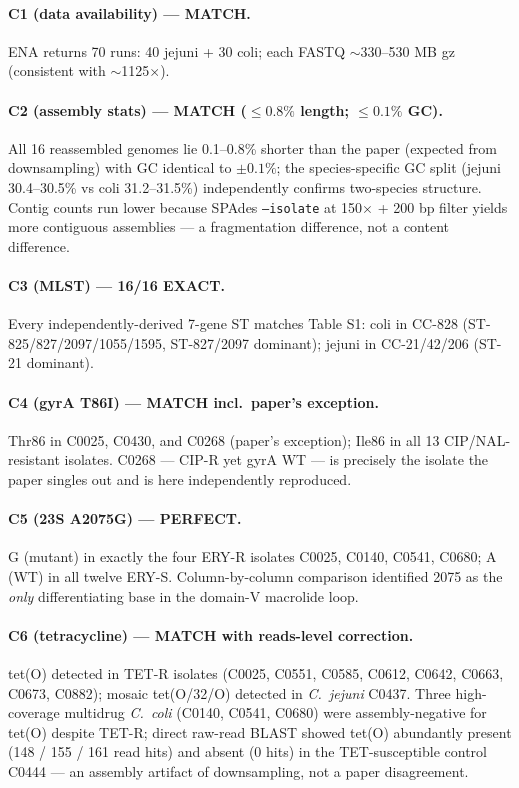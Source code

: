 \documentclass[11pt,a4paper]{article}
\begin{document}
\paragraph{C1 (data availability) --- MATCH.} ENA returns 70 runs: 40 jejuni + 30 coli; each FASTQ $\sim$330--530 MB gz (consistent with $\sim$1125$\times$).

\paragraph{C2 (assembly stats) --- MATCH ($\leq 0.8\%$ length; $\leq 0.1\%$ GC).} All 16 reassembled genomes lie 0.1--0.8\% shorter than the paper (expected from downsampling) with GC identical to $\pm 0.1\%$; the species-specific GC split (jejuni 30.4--30.5\% vs coli 31.2--31.5\%) independently confirms two-species structure. Contig counts run lower because SPAdes \texttt{--isolate} at 150$\times$ + 200 bp filter yields more contiguous assemblies --- a fragmentation difference, not a content difference.

\paragraph{C3 (MLST) --- 16/16 EXACT.} Every independently-derived 7-gene ST matches Table S1: coli in CC-828 (ST-825/827/2097/1055/1595, ST-827/2097 dominant); jejuni in CC-21/42/206 (ST-21 dominant).

\paragraph{C4 (gyrA T86I) --- MATCH incl.\ paper's exception.} Thr86 in C0025, C0430, and C0268 (paper's exception); Ile86 in all 13 CIP/NAL-resistant isolates. C0268 --- CIP-R yet gyrA WT --- is precisely the isolate the paper singles out and is here independently reproduced.

\paragraph{C5 (23S A2075G) --- PERFECT.} G (mutant) in exactly the four ERY-R isolates C0025, C0140, C0541, C0680; A (WT) in all twelve ERY-S. Column-by-column comparison identified 2075 as the \emph{only} differentiating base in the domain-V macrolide loop.

\paragraph{C6 (tetracycline) --- MATCH with reads-level correction.} tet(O) detected in TET-R isolates (C0025, C0551, C0585, C0612, C0642, C0663, C0673, C0882); mosaic tet(O/32/O) detected in \textit{C.\ jejuni} C0437. Three high-coverage multidrug \textit{C.\ coli} (C0140, C0541, C0680) were assembly-negative for tet(O) despite TET-R; direct raw-read BLAST showed tet(O) abundantly present (148 / 155 / 161 read hits) and absent (0 hits) in the TET-susceptible control C0444 --- an assembly artifact of downsampling, not a paper disagreement.
\end{document}

